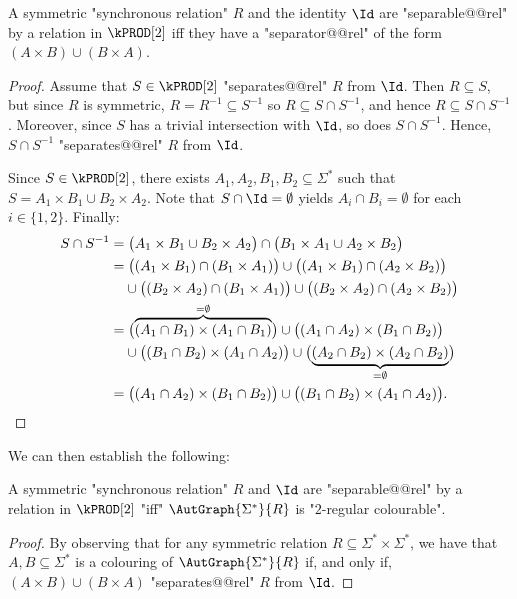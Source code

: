 \begin{lemma}
    A symmetric "synchronous relation" $R$ and the identity $\Id$ are "separable@@rel" by a relation in $\kPROD[2]$ iff they have a "separator@@rel" of the form $(A \times B) \cup (B \times A)$.
\end{lemma}
\begin{proof}
    Assume that $S \in \kPROD[2]$ "separates@@rel" $R$ from $\Id$.
    Then $R \subseteq S$, but since $R$ is symmetric, $R = R^{-1} \subseteq S^{-1}$ so
    $R \subseteq S \cap S^{-1}$, and hence $R \subseteq S \cap S^{-1}$.
    Moreover, since $S$ has a trivial intersection with $\Id$, so does $S \cap S^{-1}$.
    Hence, $S \cap S^{-1}$ "separates@@rel" $R$ from $\Id$.

    Since $S \in \kPROD[2]$, there exists $A_1,A_2,B_1,B_2 \subseteq \Sigma^*$ such that
    $S = A_1 \times B_1 \cup B_2 \times A_2$.
    Note that $S \cap \Id = \emptyset$ yields $A_i \cap B_i = \emptyset$ for each $i \in \{1,2\}$.
    Finally:
    \begin{align*}
        S \cap S^{-1} &
        =
            \bigl( A_1 \times B_1 \cup B_2 \times A_2 \bigr)
            \cap \bigl( B_1 \times A_1 \cup A_2 \times B_2 \bigr) \\
        &
        =
            \bigl( (A_1 \times B_1) \cap (B_1 \times A_1) \bigr)
            \cup \bigl( (A_1 \times B_1) \cap (A_2 \times B_2) \bigr) \\
        &
        \hphantom{=\;} \cup \bigl( (B_2 \times A_2) \cap (B_1 \times A_1) \bigr)
            \cup \bigl( (B_2 \times A_2) \cap (A_2 \times B_2) \bigr) \\
        &
        =
            \bigl( \overbrace{(A_1 \cap B_1) \times (A_1 \cap B_1)}^{= \emptyset} \bigr)
            \cup \bigl( (A_1 \cap A_2) \times (B_1 \cap B_2) \bigr) \\
        &
        \hphantom{=\;} \cup \bigl( (B_1 \cap B_2) \times (A_1 \cap A_2) \bigr)
            \cup \bigl( \underbrace{(A_2 \cap B_2) \times (A_2 \cap B_2)}_{= \emptyset} \bigr)\\
        &
        = \bigl( (A_1 \cap A_2) \times (B_1 \cap B_2) \bigr)
            \cup \bigl( (B_1 \cap B_2) \times (A_1 \cap A_2) \bigr).\qedhere
    \end{align*}
\end{proof}

We can then establish the following: 

\begin{corollary}\AP\label{cor:2reg-2prod}
    A symmetric "synchronous relation" $R$ and $\Id$ are "separable@@rel" by a relation in $\kPROD[2]$ "iff" $\AutGraph{\Sigma^*}{R}$ is "$2$-regular colourable".
\end{corollary}
\begin{proof}
    By observing that for any symmetric relation $R \subseteq \Sigma^* \times \Sigma^*$, we have that $A,B \subseteq \Sigma^*$ is a colouring of $\AutGraph{\Sigma^*}{R}$ if, and only if, $(A \times B) \cup (B \times A)$ "separates@@rel" $R$ from $\Id$.
\end{proof}

